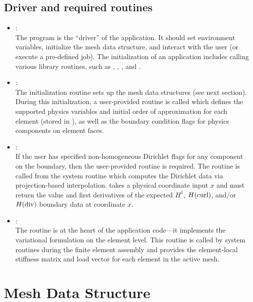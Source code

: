 \subsection{Driver and required routines}

\begin{itemize}
	\item{
		 : \\
		The  program is the ``driver'' of the application. It should set environment variables, initialize the mesh data structure, and interact with the user (or execute a pre-defined job). The initialization of an application includes calling various library routines, such as , , , and .
	}
	\item{
		 : \\
		The initialization routine  sets up the mesh data structures (see next section). During this initialization, a user-provided routine  is called which defines the supported physics variables and initial order of approximation for each element (stored in ), as well as the boundary condition flags for physics components on element faces.
	}
	\item{
		 : \\
		If the user has specified non-homogeneous Dirichlet flags for any component on the boundary, then the user-provided  routine is required. The routine is called from the system routine  which computes the Dirichlet data via projection-based interpolation.  takes a physical coordinate input $x$ and must return the value and first derivatives of the expected $H^1$, $H(\text{curl})$, and/or $H(\text{div})$ boundary data at coordinate $x$.
	}
	\item{
		 : \\
		The  routine is at the heart of the application code---it implements the variational formulation on the element level. This routine is called by system routines during the finite element assembly and provides the element-local stiffness matrix and load vector for each element in the active mesh.
	}
\end{itemize}

\section{Mesh Data Structure}
\label{sec:data-structure}


